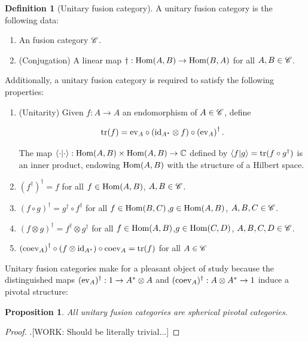 \documentclass{article}
\newtheorem{proposition}{Proposition}[section]
\theoremstyle{definition}
\newtheorem*{definition}{Definition}
\numberwithin{figure}{section}
\begin{document}
\begin{definition}[Unitary fusion category] A unitary fusion category is the following data:

\begin{enumerate}
\item An fusion category $\mathscr{C}$.
\item (Conjugation) A linear map $\dagger: \mathrm{Hom}(A,B)\to \mathrm{Hom}(B,A)$ for all $A,B\in \mathscr{C}$.
\end{enumerate}

Additionally, a unitary fusion category is required to satisfy the following properties:

\begin{enumerate}
\item (Unitarity) Given $f:A\to A$ an endomorphism of $A\in \mathscr{C}$, define


$$\mathrm{tr}(f)=\mathrm{ev}_A \circ (\mathrm{id}_{A^*}\otimes f)\circ \left(\mathrm{ev}_A\right)^{\dagger}.$$

The map $\left<\cdot|\cdot\right>:\mathrm{Hom}(A,B)\times \mathrm{Hom}(A,B)\to \mathbb{C}$ defined by $\left<f|g\right>=\mathrm{tr}(f\circ g^{\dagger})$ is an inner product, endowing $\mathrm{Hom}(A,B)$ with the structure of a Hilbert space.
\item $\left(f^{\dagger}\right)^{\dagger}=f$ for all $f\in \mathrm{Hom}(A,B)$, $A,B\in \mathscr{C}$.
\item $(f\circ g)^{\dagger}=g^{\dagger}\circ f^{\dagger}$ for all $f\in \mathrm{Hom}(B,C)$,$g\in \mathrm{Hom}(A,B)$, $A,B,C\in \mathscr{C}$.
\item $(f\otimes g)^{\dagger}=f^{\dagger}\otimes g^{\dagger}$ for all $f\in \mathrm{Hom}(A,B)$,$g\in \mathrm{Hom}(C,D)$, $A,B,C,D\in \mathscr{C}$.
\item $\left(\mathrm{coev}_A\right)^{\dagger}\circ (f \otimes \mathrm{id}_{A^*})\circ \mathrm{coev}_A=\mathrm{tr}(f)$ for all $A\in \mathscr{C}$
\end{enumerate}

\raggedleft\qedsymbol{}
\end{definition}

Unitary fusion categories make for a pleasant object of study because the distinguished maps $(\mathrm{ev}_A)^{\dagger}:1\to A^{*}\otimes A$ and $(\mathrm{coev}_A)^{\dagger}:A\otimes A^{*}\to 1$ induce a pivotal structure:

\begin{proposition} All unitary fusion categories are spherical pivotal categories.
\end{proposition}
\begin{proof}.[WORK: Should be literally trivial...]
\end{proof}
\end{document}

